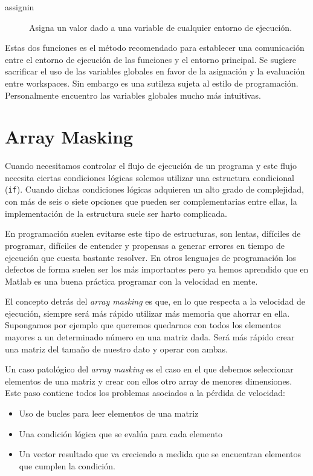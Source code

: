 \begin{description}

\item [assignin]Asigna un valor dado a una variable de
  cualquier entorno de ejecución.
\end{description}

Estas dos funciones es el método recomendado para establecer una
comunicación entre el entorno de ejecución de las funciones y el
entorno principal.  Se sugiere sacrificar el uso de las variables
globales en favor de la asignación y la evaluación entre workspaces.
Sin embargo es una sutileza sujeta al estilo de programación.
Personalmente encuentro las variables globales mucho más intuitivas.


\section{Array Masking}

Cuando necesitamos controlar el flujo de ejecución de un programa y este
flujo necesita ciertas condiciones lógicas solemos utilizar una 
estructura condicional (\texttt{if}).  Cuando dichas condiciones lógicas
adquieren un alto grado de complejidad, con más de seis o siete opciones
que pueden ser complementarias entre ellas, la implementación de la
estructura suele ser harto complicada.

En programación suelen evitarse este tipo de estructuras, son lentas,
difíciles de programar, difíciles de entender y propensas a generar
errores en tiempo de ejecución que cuesta bastante resolver. En otros
lenguajes de programación los defectos de forma suelen ser los más
importantes pero ya hemos aprendido que en Matlab es una buena práctica
programar con la velocidad en mente.

El concepto detrás del \emph{array masking} es que, en lo que respecta
a la velocidad de ejecución, siempre será más rápido utilizar más
memoria que ahorrar en ella.  Supongamos por ejemplo que queremos
quedarnos con todos los elementos mayores a un determinado número en
una matriz dada. Será más rápido crear una matriz del tamaño de
nuestro dato y operar con ambas.

Un caso patológico del \emph{array masking} es el caso en el que
debemos seleccionar elementos de una matriz y crear con ellos otro
array de menores dimensiones. Este paso contiene todos los problemas
asociados a la pérdida de velocidad:
\begin{itemize}
\item Uso de bucles para leer elementos de una matriz
\item Una condición lógica que se evalúa para cada elemento
\item Un vector resultado que va creciendo a medida que se encuentran
  elementos que cumplen la condición.
\end{itemize}

